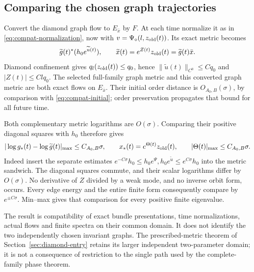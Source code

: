 \documentclass[11pt]{amsart}
\theoremstyle{definition}
\theoremstyle{remark}
\begin{document}
\subsection{Comparing the chosen graph trajectories}
Convert the diamond graph flow to $E_{\bar x}$ by $F$.
At each time normalize it as in
\eqref{eq:compat-normalization}, now with
$v=\Psi_\diamond(l,z_{\rm old}(t))$. Its exact metric becomes
\[
 \widetilde g(t)^*(h_0e^{\widetilde u(t)}),\qquad
 \widetilde x(t)=e^{Z(t)}z_{\rm old}(t)
                         =\widetilde g(t)\bar x .
\]
Diamond confinement gives
$q_l(z_{\rm old}(t))\le q_0$, hence
$\|\widetilde u(t)\|_{C^0}\le Cq_0$ and $|Z(t)|\le Clq_0$.
The selected full-family graph metric and this converted graph
metric are both exact flows on $E_{\bar x}$. Their initial
order distance is $O_{A_0,B}(\sigma)$, by comparison with
\eqref{eq:compat-initial}; order preservation propagates that
bound for all future time.

Both complementary metric logarithms are $O(\sigma)$.
Comparing their positive diagonal squares with $h_0$ therefore
gives
\begin{equation}\label{eq:compatible-trajectories}
 |\log g_*(t)-\log\widetilde g(t)|_{\max}
       \le C_{A_0,B}\sigma,\qquad
 x_*(t)=e^{\Theta(t)}z_{\rm old}(t),\qquad
 |\Theta(t)|_{\max}\le C_{A_0,B}\sigma .
\end{equation}
Indeed insert the separate estimates
$e^{-C\sigma}h_0\le h_0e^{\Psi},h_0e^{\widetilde u}
\le e^{C\sigma}h_0$ into the metric sandwich. The diagonal
squares commute, and their scalar logarithms differ by
$O(\sigma)$. No derivative of $Z$ divided by a weak mode,
and no inverse orbit form, occurs. Every edge energy and the
entire finite form consequently compare by $e^{\pm C\sigma}$.
Min--max gives that comparison for every positive finite eigenvalue.

The result is compatibility of exact bundle presentations,
time normalizations, actual flows and finite spectra on their
common domain. It does not identify the two independently chosen
invariant graphs. The prescribed-metric theorem of
Section~\ref{sec:diamond-entry} retains its larger independent
two-parameter domain; it is not a consequence of restriction
to the single path used by the complete-family phase theorem.
\end{document}
